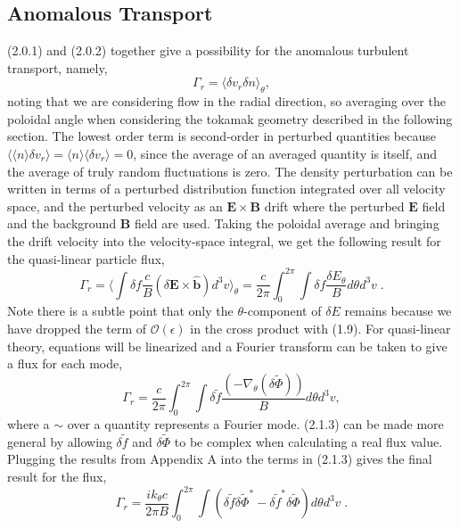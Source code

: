 \documentclass[12pt]{article}
\numberwithin{equation}{subsection}
\begin{document}
\subsection{Anomalous Transport}
   \quad (2.0.1) and (2.0.2) together give a possibility for the anomalous turbulent transport, namely,
   \begin{equation}
      \Gamma_r = \langle\delta v_r \delta n\rangle_\theta,
   \end{equation}
noting that we are considering flow in the radial direction, so averaging over the poloidal angle when considering the tokamak
geometry described in the following section. The lowest order term is second-order in perturbed quantities because
$\langle \langle n \rangle \delta v_r \rangle = \langle n \rangle \langle \delta v_r \rangle = 0$, since the average of an averaged
quantity is itself, and the average of truly random fluctuations is zero. The density perturbation can be written in terms of a
perturbed distribution function integrated over all velocity space, and the perturbed velocity as an $\bm{E}\times\bm{B}$ drift
where the perturbed $\bm{E}$ field and the background $\bm{B}$ field are used. Taking the poloidal average and bringing the drift
velocity into the velocity-space integral, we get the following result for the quasi-linear particle flux, 
   \begin{equation}
      \Gamma_r = \langle\int\delta f \frac{c}{B}(\delta\bm{E}\times\bm{\hat{b}}) d^{3}v\rangle_\theta
               = \frac{c}{2\pi}\int_{0}^{2\pi} \int\delta f \frac{\delta E_\theta}{B}d\theta d^{3}v \;.
   \end{equation}
Note there is a subtle point that only the $\theta$-component of $\delta E$ remains because we have dropped the term of
$\mathcal{O}(\epsilon)$ in the cross product with (1.9). For quasi-linear theory, equations will be linearized
and a Fourier transform can be taken to give a flux for each mode,
   \begin{equation}
      \Gamma_r = \frac{c}{2\pi}\int_{0}^{2\pi} \int\delta\widetilde{f}
                    \frac{(-\nabla_\theta(\delta\widetilde{\Phi}))}{B}d\theta d^{3}v,
   \end{equation}
where a $\sim$ over a quantity represents a Fourier mode. (2.1.3) can be made more general by allowing $\delta\widetilde{f}$ and $\delta\widetilde{\Phi}$
to be complex when calculating a real flux value. Plugging the results from Appendix A into
the terms in (2.1.3) gives the final result for the flux,
   \begin{equation}
      \Gamma_r = \frac{ik_\theta c}{2\pi B}\int_{0}^{2\pi}\int(\delta\widetilde{f}\delta\widetilde{\Phi}^*-\delta\widetilde{f}^*\delta\widetilde{\Phi})d\theta d^{3}v\;.
   \end{equation}
\end{document}
